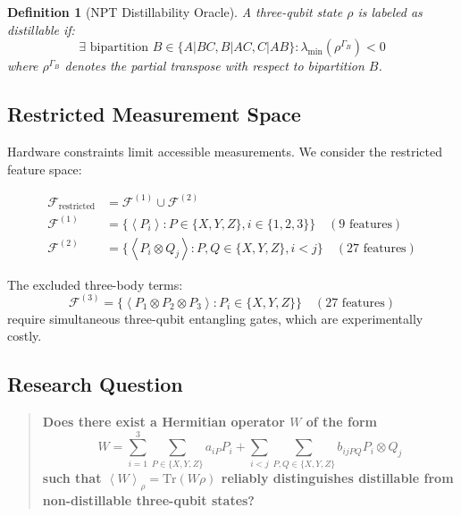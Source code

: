 \documentclass[11pt,a4paper]{article}
\newcommand{\expect}[1]{\left\langle#1\right\rangle}
\newtheorem{definition}{Definition}
\begin{document}
\begin{definition}[NPT Distillability Oracle]
A three-qubit state $\rho$ is labeled as distillable if:
\begin{equation}
\exists \text{ bipartition } B \in \{A|BC, B|AC, C|AB\}: \lambda_{\min}(\rho^{\Gamma_B}) < 0
\end{equation}
where $\rho^{\Gamma_B}$ denotes the partial transpose with respect to bipartition $B$.
\end{definition}

\subsection{Restricted Measurement Space}

Hardware constraints limit accessible measurements. We consider the restricted feature space:

\begin{align}
\mathcal{F}_{\text{restricted}} &= \mathcal{F}^{(1)} \cup \mathcal{F}^{(2)} \\
\mathcal{F}^{(1)} &= \{\expect{P_i} : P \in \{X, Y, Z\}, i \in \{1,2,3\}\} \quad (9 \text{ features}) \\
\mathcal{F}^{(2)} &= \{\expect{P_i \otimes Q_j} : P,Q \in \{X,Y,Z\}, i < j\} \quad (27 \text{ features})
\end{align}

The excluded three-body terms:
\begin{equation}
\mathcal{F}^{(3)} = \{\expect{P_1 \otimes P_2 \otimes P_3} : P_i \in \{X,Y,Z\}\} \quad (27 \text{ features})
\end{equation}
require simultaneous three-qubit entangling gates, which are experimentally costly.

\subsection{Research Question}

\begin{quote}
\textbf{Does there exist a Hermitian operator $W$ of the form}
\begin{equation}
W = \sum_{i=1}^{3} \sum_{P \in \{X,Y,Z\}} a_{iP} P_i + \sum_{i<j} \sum_{P,Q \in \{X,Y,Z\}} b_{ijPQ} P_i \otimes Q_j
\end{equation}
\textbf{such that $\expect{W}_\rho = \text{Tr}(W\rho)$ reliably distinguishes distillable from non-distillable three-qubit states?}
\end{quote}
\end{document}
